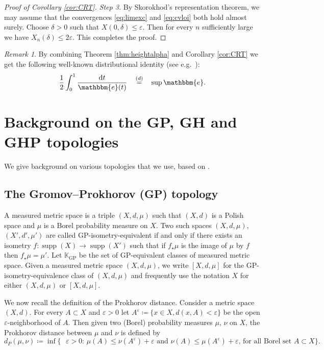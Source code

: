 \documentclass[11pt]{article}
\theoremstyle{plain}
\theoremstyle{definition}
\theoremstyle{remark}
\newtheorem{remark}[theorem]{Remark}
\newcommand{\1}{\mathbbm{1}} %
\newcommand{\e}{\varepsilon} %
\DeclareMathOperator*{\supp}{supp}
\newcommand{\GP}{\text{GP}}
\begin{document}
\begin{proof}[Proof of Corollary \ref{cor:CRT}]
\emph{Step 3.} By Skorokhod's representation theorem, we may assume that the convergences \eqref{eq:limexc} and \eqref{eq:cvloi} both hold almost surely. Choose $\delta>0$ such that  $X(0,\delta) \leq \varepsilon$. Then for every $n$ sufficiently large we have $X_{n}(\delta) \leq 2 \varepsilon$. This completes the proof.
\end{proof}



\begin{remark}
By combining Theorem \ref{thm:heightalpha} and Corollary \ref{cor:CRT} we get the following well-known distributional identity (see e.g.~\cite{CMY00}):
\[
\frac{1}{2} \int_{0}^{1} \frac{\mathrm{d} t}{\mathbbm{e}(t)} \quad \mathop{=}^{(d)} \quad \sup \mathbbm{e}.
\]
\end{remark}










\appendix

\section{Background on the GP, GH and GHP topologies}
\label{sec:background}
We give background on various topologies that we use, based on \cite{Bla21,Bla22}.
\subsection{The Gromov--Prokhorov (GP) topology} \label{GPdef}
A measured metric space is a triple $(X,d,\mu)$ such that $(X,d)$ is a Polish space and $\mu$ is a Borel probability measure on $X$. Two such spaces $(X,d,\mu)$, $(X',d',\mu')$ are called GP-isometry-equivalent if and only if there exists an isometry $f:\supp(X)\to \supp(X')$ such that if $f_\star \mu$ is the image of $\mu$ by $f$ then $f_\star \mu=\mu'$. Let $\mathbb{K}_{\GP}$ be the set of GP-equivalent classes of measured metric space. Given a measured metric space $(X,d,\mu)$, we write $[X,d,\mu]$ for the GP-isometry-equivalence class of $(X,d,\mu)$ and frequently use the notation $X$ for either $(X,d,\mu)$ or $[X,d,\mu]$.


We now recall the definition of the Prokhorov distance. Consider a metric space $(X,d)$. For every $A\subset X$ and $\e>0$ let $A^\e\coloneqq \{x\in X, d(x,A)<\e\}$ be the open $\varepsilon$-neighborhood of $A$. Then given two (Borel) probability measures $\mu$, $\nu$ on $X$, the Prokhorov distance between $\mu$ and $\nu$ is defined by 
\[d_P(\mu, \nu)\coloneqq \inf\{\text{ $\e>0$: $\mu(A)\leq \nu (A^\e)+\e$ and $\nu(A)\leq  \mu(A^\e)+\e$, for all Borel set $A\subset X$} \}.\]
\end{document}
